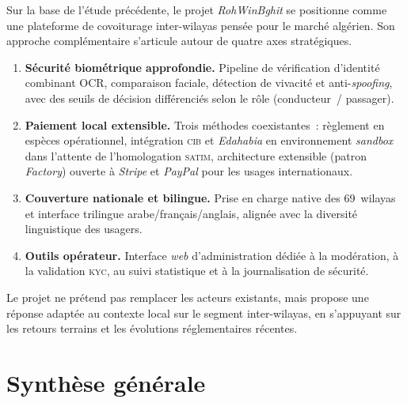 Sur la base de l'étude précédente, le projet \textit{RohWinBghit} se positionne comme une plateforme de covoiturage inter-wilayas pensée pour le marché algérien. Son approche complémentaire s'articule autour de quatre axes stratégiques.
\begin{enumerate}
  \item \textbf{Sécurité biométrique approfondie.} Pipeline de vérification d'identité combinant OCR, comparaison faciale, détection de vivacité et anti-\textit{spoofing}, avec des seuils de décision différenciés selon le rôle (conducteur~/ passager).
  \item \textbf{Paiement local extensible.} Trois méthodes coexistantes~: règlement en espèces opérationnel, intégration \textsc{cib} et \textit{Edahabia} en environnement \textit{sandbox} dans l'attente de l'homologation \textsc{satim}, architecture extensible (patron \textit{Factory}) ouverte à \textit{Stripe} et \textit{PayPal} pour les usages internationaux.
  \item \textbf{Couverture nationale et bilingue.} Prise en charge native des 69~wilayas et interface trilingue arabe/français/anglais, alignée avec la diversité linguistique des usagers.
  \item \textbf{Outils opérateur.} Interface \textit{web} d'administration dédiée à la modération, à la validation \textsc{kyc}, au suivi statistique et à la journalisation de sécurité.
\end{enumerate}

Le projet ne prétend pas remplacer les acteurs existants, mais propose une réponse adaptée au contexte local sur le segment inter-wilayas, en s'appuyant sur les retours terrains et les évolutions réglementaires récentes.

\section{Synthèse générale}
\label{sec:synthese}

